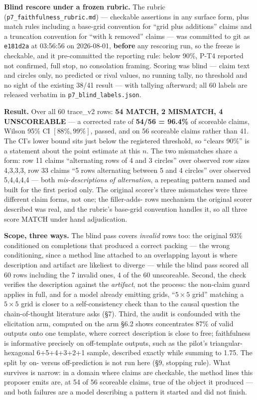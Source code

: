 \textbf{Blind rescore under a frozen rubric.} The rubric (\texttt{p7\_faithfulness\_rubric.md}) --- checkable
assertions in any surface form, plus match rules including a base-grid convention for ``grid plus
additions'' claims and a truncation convention for ``with k removed'' claims --- was committed to git
as \texttt{e181d2a} at 03:56:56 on 2026-08-01, \textbf{before} any rescoring run, so the freeze is checkable,
and it pre-committed the reporting rule: below 90\%, P-T4 reported not confirmed, full stop, no
consolation framing. Scoring was blind --- claim text and circles only, no predicted or rival
values, no running tally, no threshold and no sight of the existing 38/41 result --- with tallying
afterward; all 60 labels are released verbatim in \texttt{p7\_blind\_labels.json}.

\textbf{Result.} Over all 60 trace\_v2 rows: \textbf{54 MATCH, 2 MISMATCH, 4 UNSCOREABLE} --- a corrected rate
of \textbf{54/56 = 96.4\%} of scoreable claims, Wilson 95\% CI $[88\%, 99\%]$, passed, and on 56 scoreable
claims rather than 41. The CI's lower bound sits just below the registered threshold, so ``clears
90\%'' is a statement about the point estimate at this $n$. The two mismatches share a form: row 11
claims ``alternating rows of 4 and 3 circles'' over observed row sizes 4,3,3,3, row 33 claims ``5
rows alternating between 5 and 4 circles'' over observed 5,4,4,4,4 --- both \emph{mis-descriptions of
alternation}, a repeating pattern named and built for the first period only. The original scorer's
three mismatches were three different claim forms, not one; the filler-adds-
rows mechanism the original scorer described was real, and the rubric's base-grid convention handles it, so
all three score MATCH under hand adjudication.

\textbf{Scope, three ways.} The blind pass covers \emph{invalid} rows too: the original 93\% conditioned on
completions that produced a correct packing --- the wrong conditioning, since a method line attached
to an overlapping layout is where description and artifact are likeliest to diverge --- while the
blind pass scored all 60 rows including the 7 invalid ones, 4 of the 60 unscoreable. Second, the
check verifies the description against the \emph{artifact}, not the process: the non-claim guard
applies in full, and for a model already emitting grids, ``$5 \times 5$ grid'' matching a $5 \times 5$ grid is closer
to a self-consistency check than to the causal question the chain-of-thought literature asks (\S7).
Third, the audit is confounded with the elicitation arm, computed on the arm \S6.2 shows
concentrates 87\% of valid outputs onto one template, where correct description is close to free;
faithfulness is informative precisely on off-template outputs, such as the pilot's
triangular-hexagonal 6+5+4+3+2+1 sample, described exactly while summing to 1.75. The split by on-
versus off-prediction is not run here (\S9, stopping rule). What survives is narrow: in a domain
where claims are checkable, the method lines this proposer emits are, at 54 of 56 scoreable
claims, true of the object it produced --- and both failures are a model describing a pattern it
started and did not finish.
